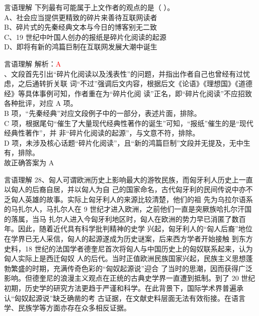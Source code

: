 \documentclass[aspectratio=169]{beamer}
\begin{document}
\begin{frame}[t]{言语理解}
    下列最有可能属于上文作者的观点的是（ ）。\\
    A、社会应当提供更精致的碎片来善待互联网读者\\
    B、碎片式的先秦经典文本与今日的博客别无二致\\
    C、19 世纪中叶国人创办的报纸是碎片化阅读的起源\\
    D、即将有新的鸿篇巨制在互联网发展大潮中诞生\\
\end{frame}


\begin{frame}[t]{言语理解}
    解析：\textcolor{red}{A}\\
    、文段首先引出“碎片化阅读以及浅表性”的问题，并指出作者自己也曾经有过忧虑，之后通转折关联
    词“不过”强调后文内容，根据后文《论语》《理想国》《道德经》等具体事例可知，作者重在为“碎片化阅
    读”正名，即“碎片化阅读”不应招致各种批评，对应 A 项。\\
    B 项，“先秦经典”对应文段例子中的一部分，表述片面，排除。\\
    C 项，根据尾句“催生了大量现代经典性著作的诞生”可知，“报纸”催生的是“现代经典性著作”，并
    非“碎片化阅读的起源”，与文意不符，排除。\\
    D 项，未涉及核心话题“碎片化阅读”，且“新的鸿篇巨制”文段并无提及，无中生有，排除。\\
    故正确答案为 A\\
\end{frame}


\begin{frame}[t]{言语理解}
    28、匈人可谓欧洲历史上影响最大的游牧民族，而匈牙利人历史上一直以匈人的后裔自居，并以匈人为自
    己的国家命名，古代匈牙利的民间传说中亦不乏匈人英雄的故事。实际上匈牙利人的来源比较清楚，他们的祖
    先为乌拉尔语系的马扎尔人，马扎尔人在 9 世纪才进入欧洲，之前他们一直是突厥族哈扎尔汗国的落属，当马
    扎尔人进入今匈牙利地区时，匈人在欧洲的势力早已消匿了数百年。因此，随着近代具有科学批判精神的史学
    兴起，匈牙利人的“匈人后裔”地位在学界已无人采信，匈人的起源遂成为历史谜案，后来西方学者开始接触
    到东方史料，18 世纪的法国学者德奎尼首次将匈人与中国历史上的匈奴联系起来，认为匈人实际上是西迁匈奴
    人的后代。当时正值欧洲民族国家兴起，民族主义思想蓬勃繁盛的时期，充满传奇色彩的“匈奴起源说”迎合
    了当时的思潮，因而获得广泛影响。但德奎尼的浪漫主义观点在正统的古典史学界一直遭到抵制。到了 20 世纪
    初期，历史学的研究方法更趋于严谨和科学。在此背景下，国际学术界普遍承认“匈奴起源说”缺乏确凿的考
    古证据，在文献史料层面无法有效衔接。在语言学、民族学等方面亦存在众多相反证据。\\
\end{frame}
\end{document}
